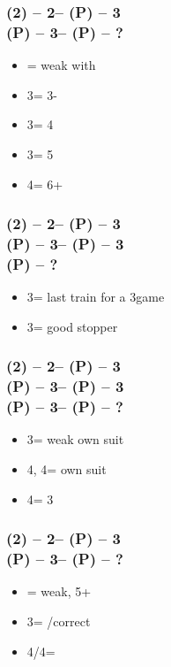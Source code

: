 \subsubsection*{(2\spades) -- 2\nt -- (P) -- 3\clubs \\
                (P) -- 3\diams -- (P) -- ?}
\begin{itemize}
    \item \pass = weak with \diams
    \item 3\hearts = 3-\hearts
    \item 3\spades = 4\hearts
    \item 3\nt = 5\hearts
    \item 4\clubs = 6+\hearts
\end{itemize}

\subsubsection*{(2\spades) -- 2\nt -- (P) -- 3\clubs \\
                (P) -- 3\diams -- (P) -- 3\hearts \\
                (P) -- ?}
\begin{itemize}
    \item 3\spades = last train for a 3\nt game
    \item 3\nt = good \spades stopper
\end{itemize}

\subsubsection*{(2\spades) -- 2\nt -- (P) -- 3\clubs \\
                (P) -- 3\diams -- (P) -- 3\hearts \\
                (P) -- 3\spades -- (P) -- ?}
\begin{itemize}
    \item 3\nt = weak own suit
    \item 4\clubs, 4\diams = own suit
    \item 4\hearts = 3\hearts
\end{itemize}

\subsubsection*{(2\spades) -- 2\nt -- (P) -- 3\diams \\
                (P) -- 3\hearts -- (P) -- ?}
\begin{itemize}
    \item \pass = weak, 5+\hearts
    \item 3\nt = \pass/correct
    \item 4\clubs/4\diams = \nat
\end{itemize}

